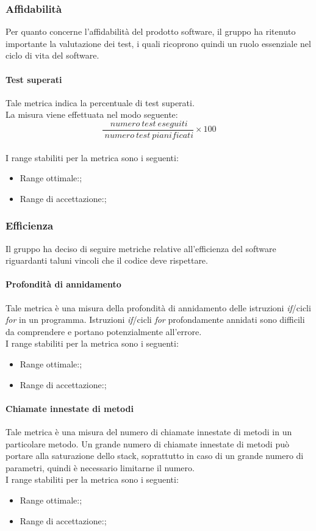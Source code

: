 		\subsubsection{Affidabilità \label{S2}}
		Per quanto concerne l'affidabilità del prodotto software, il gruppo ha ritenuto importante la valutazione dei test, i quali ricoprono quindi un ruolo essenziale nel ciclo di vita del software.
			\paragraph{Test superati}
			Tale metrica indica la percentuale di test superati.
			\\La misura viene effettuata nel modo seguente:
			\begin{equation}
			\frac{~numero~test~eseguiti}{~numero~test~pianificati}\times{100}
			\end{equation}
			\\I range stabiliti per la metrica sono i seguenti:
			\begin{itemize}
				\item Range ottimale:;
				\item Range di accettazione:;
			\end{itemize}
		\subsubsection{Efficienza \label{S3}}
		Il gruppo \hx{} ha deciso di seguire metriche relative all'efficienza del software riguardanti taluni vincoli che il codice deve rispettare.
			\paragraph{Profondità di annidamento}
			Tale metrica è una misura della profondità di annidamento delle istruzioni \textit{if}/cicli \textit{for} in un programma. Istruzioni \textit{if}/cicli \textit{for} profondamente annidati sono difficili da comprendere e portano potenzialmente all'errore.
			\\I range stabiliti per la metrica sono i seguenti:
			\begin{itemize}
				\item Range ottimale:;
				\item Range di accettazione:;
			\end{itemize}
			
			\paragraph{Chiamate innestate di metodi}
			Tale metrica è una misura del numero di chiamate innestate di metodi in un particolare metodo. Un grande numero di chiamate innestate di metodi può portare alla saturazione dello stack, soprattutto in caso di un grande numero di parametri, quindi è necessario limitarne il numero.
			\\I range stabiliti per la metrica sono i seguenti:
			\begin{itemize}
				\item Range ottimale:;
				\item Range di accettazione:;
			\end{itemize}
